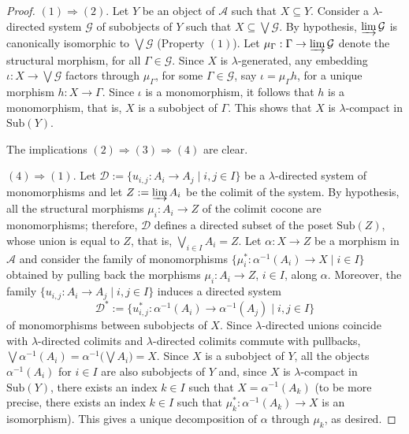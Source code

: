 \documentclass{amsproc}
\theoremstyle{definition}
\theoremstyle{plain}
\theoremstyle{remark}
\numberwithin{equation}{section}
\newcommand{\Cal}[1]{{\mathcal #1}}
\newcommand{\sub}[1]{\mathrm{Sub} (#1)}
\newcommand{\colim}{\varinjlim}
\begin{document}
\begin{proof}
    $(1)\Rightarrow(2)$. Let $Y$ be an object of $\mathscr A$ such that $X\subseteq Y$. Consider a $\lambda$-directed system $\mathcal G$ of subobjects of $Y$ such that $X\subseteq \bigvee \mathcal G$. By hypothesis, $\colim \mathcal G$ is canonically isomorphic to $\bigvee \mathcal G$ (Property $(1)$). Let $\mu_\Gamma:\Gamma\to \colim \mathcal G$ denote the structural morphism, for all $\Gamma\in\mathcal G$. Since $X$ is $\lambda$-generated, any embedding $\iota:X\to \bigvee \mathcal G$ factors through  $\mu_\Gamma$, for some $\Gamma\in\mathcal G$, say $\iota=\mu_\Gamma h$, for a unique morphism $h:X\to \Gamma$. Since $\iota$ is a monomorphism, it follows that $h$ is a monomorphism, that is,  $X$ is a subobject of $\Gamma$. This shows that $X$ is $\lambda$-compact in $\sub Y$. 

    The implications $(2)\Rightarrow(3) \Rightarrow (4)$ are clear.
    
    $(4)\Rightarrow(1)$. Let $\Cal D:= \{u_{i,j}\colon A_i\to A_j\mid i,j \in I\}$ be a $\lambda$-directed system of monomorphisms and let $Z:= \colim A_i$ be the colimit of the system. By hypothesis, all the structural morphisms $\mu_i \colon A_i \to Z$ of the colimit cocone are monomorphisms; therefore, $\Cal D$ defines a directed subset of the poset $\sub Z$, whose union is equal to $Z$, that is, $\bigvee_{i \in I} A_i=Z$.
    Let $\alpha \colon X \to Z$ be a morphism in $\mathscr{A}$ and consider the family of monomorphisms $\{\mu^*_i \colon \alpha^{-1}(A_i)\to X\mid i \in I\}$ obtained by pulling back the morphisms $\mu_i \colon A_i \to Z$, $i \in I$, along $\alpha$. Moreover, the family $\{u_{i,j}\colon A_i\to A_j\mid i,j \in I\}$ induces a directed system
    $$
    \Cal D^*:=\{u^*_{i,j}\colon \alpha^{-1}(A_i)\to \alpha^{-1}(A_j)\mid i,j \in I\}
    $$
    of monomorphisms between subobjects of $X$. Since $\lambda$-directed unions coincide with $\lambda$-directed colimits and $\lambda$-directed colimits commute with pullbacks, $\bigvee \alpha^{-1}(A_i)=\alpha^{-1}\big( \bigvee A_i \big)=X$. Since $X$ is a subobject of $Y$, all the objects $\alpha^{-1}(A_i)$ for $i \in I$ are also subobjects of $Y$ and, since $X$ is $\lambda$-compact in $\sub Y$, there exists an index $k \in I$ such that $X=\alpha^{-1}(A_k)$ (to be more precise, there exists an index $k \in I$ such that $\mu_k^\ast\colon \alpha^{-1}(A_k)\to X$ is an isomorphism). This gives a unique decomposition of $\alpha$ through $\mu_k$, as desired.
\end{proof}
\end{document}
